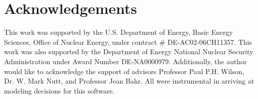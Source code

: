 \section{Acknowledgements}
This work was supported by the U.S.  Department of Energy, Basic Energy
Sciences, Office of Nuclear Energy, under contract \# DE-AC02-06CH11357.  This
work was also supported by the Department of Energy National Nuclear Security
Administration under Award Number DE‐NA0000979. Additionally, the author would
like to acknowledge the support of advisors Professor Paul P.H. Wilson, Dr.
W. Mark Nutt, and Professor Jean Bahr. All were instrumental in arriving at 
modeling decisions for this software.
